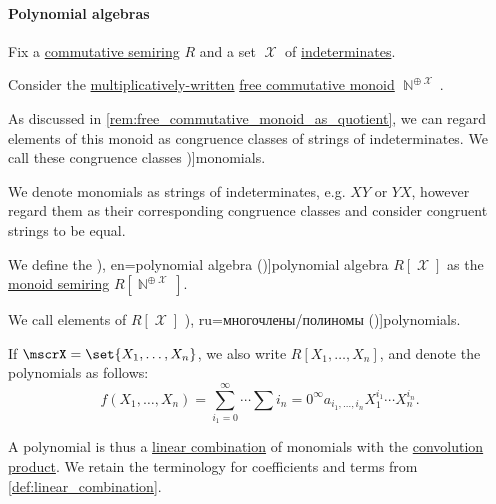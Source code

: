 \paragraph{Polynomial algebras}

\begin{definition}\label{def:polynomial_algebra}\mimprovised
  Fix a \hyperref[def:semiring/commutative]{commutative semiring} \( R \) and a set \( \mscrX \) of \hyperref[con:indeterminate]{indeterminates}.

  \begin{thmenum}
     Consider the \hyperref[def:free_commutative_monoid]{multiplicatively-written} \hyperref[def:free_commutative_monoid]{free commutative monoid} \( \BbbN^{\oplus \mscrX} \).

    As discussed in \cref{rem:free_commutative_monoid_as_quotient}, we can regard elements of this monoid as congruence classes of strings of indeterminates. We call these congruence classes \term[ru=одночлен/моном (\cite[\S 11.3]{Тыртышников2007ЛинейнаяАлгебра})]{monomials}.

    We denote monomials as strings of indeterminates, e.g. \( XY \) or \( YX \), however regard them as their corresponding congruence classes and consider congruent strings to be equal.

     We define the \term[ru=алгебра многочленов (\cite[92]{Винберг2014КурсАлгебры}), en=polynomial algebra (\cite[473]{Bourbaki1998Algebra1to3})]{polynomial algebra} \( R[\mscrX] \) as the \hyperref[def:semigroup_algebra]{monoid semiring} \( R[\BbbN^{\oplus \mscrX}] \).

    We call elements of \( R[\mscrX] \) \term[bg=полиноми (\cite[1]{Обрешков1962ВисшаАлгебра}), ru=многочлены/полиномы (\cite[\S 11.3]{Тыртышников2007ЛинейнаяАлгебра})]{polynomials}.

    If \( \mscrX = \set{ X_1, \ldots, X_n } \), we also write \( R[X_1, \ldots, X_n] \), and denote the polynomials as follows:
    \begin{equation}\label{eq:def:polynomial_algebra/polynomials}
      f(X_1, \ldots, X_n) = \sum_{i_1=0}^\infty \cdots \sum{i_n=0}^\infty a_{i_1,\ldots,i_n} X_1^{i_1} \cdots X_n^{i_n}.
    \end{equation}

    A polynomial is thus a \hyperref[def:linear_combination]{linear combination} of monomials with the \hyperref[def:semigroup_algebra]{convolution product}. We retain the terminology for coefficients and terms from \cref{def:linear_combination}.


\end{thmenum}
\end{definition}
